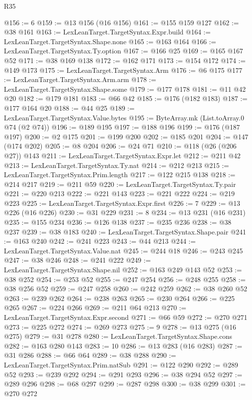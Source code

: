 \begin{lexlean}{R35}
\begin{coremodule}
@156 := 6
@159 := @13 @156 (@16 @156)
@161 := @155 @159 @127
@162 := @38 @161
@163 := LexLeanTarget.TargetSyntax.Expr.build
@164 := LexLeanTarget.TargetSyntax.Shape.none
@165 := @163 @164
@166 := LexLeanTarget.TargetSyntax.Ty.option
@167 := @166 @25
@169 := @165 @167 @52
@171 := @38 @169 @138
@172 := @162 @171
@173 := @154 @172
@174 := @149 @173
@175 := LexLeanTarget.TargetSyntax.Arm
@176 := @6 @175
@177 := LexLeanTarget.TargetSyntax.Arm.arm
@178 := LexLeanTarget.TargetSyntax.Shape.some
@179 := @177 @178
@181 := @11 @42 @20
@182 := @179 @181
@183 := @66 @42
@185 := @176 (@182 @183)
@187 := @177 @164 @20
@188 := @44 @25
@189 := LexLeanTarget.TargetSyntax.Value.bytes
@195 := ByteArray.mk (List.toArray.{0} @74 (@2 @74))
@196 := @189 @195
@197 := @188 @196
@199 := @176 (@187 @197)
@200 := @2 @175
@201 := @199 @200
@202 := @185 @201
@204 := @147 (@174 @202)
@205 := @8 @204
@206 := @24 @71
@210 := @118 (@26 (@206 @27)) @143
@211 := LexLeanTarget.TargetSyntax.Expr.let
@212 := @211 @42
@213 := LexLeanTarget.TargetSyntax.Ty.nat
@214 := @212 @213
@215 := LexLeanTarget.TargetSyntax.Prim.length
@217 := @122 @215 @138
@218 := @214 @217
@219 := @211 @59
@220 := LexLeanTarget.TargetSyntax.Ty.pair
@221 := @220 @213
@222 := @221 @143
@223 := @221 @222
@224 := @219 @223
@225 := LexLeanTarget.TargetSyntax.Expr.first
@226 := 7
@229 := @13 @226 (@16 @226)
@230 := @31 @229
@231 := 8
@234 := @13 @231 (@16 @231)
@235 := @155 @234
@236 := @126 @138
@237 := @235 @236
@238 := @38 @237
@239 := @38 @183
@240 := LexLeanTarget.TargetSyntax.Shape.pair
@241 := @163 @240
@242 := @241 @223
@243 := @44 @213
@244 := LexLeanTarget.TargetSyntax.Value.nat
@245 := @244 @18
@246 := @243 @245
@247 := @38 @246
@248 := @241 @222
@249 := LexLeanTarget.TargetSyntax.Shape.nil
@252 := @163 @249 @143 @52
@253 := @38 @252
@254 := @253 @52
@255 := @247 @254
@256 := @248 @255
@258 := @38 @256 @52
@259 := @247 @258
@260 := @242 @259
@262 := @38 @260 @52
@263 := @239 @262
@264 := @238 @263
@265 := @230 @264
@266 := @225 @265
@267 := @224 @266
@269 := @211 @64 @213
@270 := LexLeanTarget.TargetSyntax.Expr.second
@271 := @66 @59
@272 := @270 @271
@273 := @225 @272
@274 := @269 @273
@275 := 9
@278 := @13 @275 (@16 @275)
@279 := @31 @278
@280 := LexLeanTarget.TargetSyntax.Shape.cons
@282 := @163 @280 @143
@283 := 10
@286 := @13 @283 (@16 @283)
@287 := @31 @286
@288 := @66 @64
@289 := @38 @288
@290 := LexLeanTarget.TargetSyntax.Prim.natSub
@291 := @122 @290
@292 := @289 @52
@293 := @239 @292
@294 := @291 @293
@296 := @38 @294 @52
@297 := @289 @296
@298 := @68 @297
@299 := @287 @298
@300 := @38 @299
@301 := @270 @272

\end{coremodule}
\end{lexlean}
